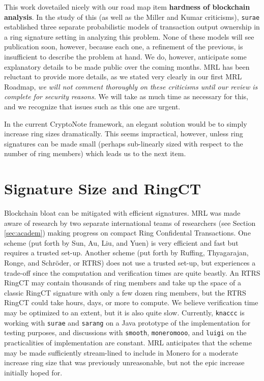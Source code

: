 \documentclass[12pt,english]{mrl}
\theoremstyle{definition}
\numberwithin{equation}{section}
\numberwithin{figure}{section}
\numberwithin{equation}{section}
\numberwithin{equation}{section}
\numberwithin{figure}{section}
\begin{document}
This work dovetailed nicely with our road map item \textbf{hardness of blockchain analysis}.  In the study of this (as well as the Miller and Kumar criticisms), \texttt{surae} established three separate probabilistic models of transaction output ownership in a ring signature setting in analyzing this problem. None of these models will see publication soon, however, because each one, a refinement of the previous, is insufficient to describe the problem at hand. We do, however, anticipate some explanatory details to be made public over the coming months. MRL has been reluctant to provide more details, as we stated very clearly in our first MRL Roadmap, \emph{we will not comment thoroughly on these criticisms until our review is complete for security reasons.} We will take as much time as necessary for this, and we recognize that issues such as this one are urgent.
    
In the current CryptoNote framework, an elegant solution would be to simply increase ring sizes dramatically. This seems impractical, however, unless ring signatures can be made small (perhaps sub-linearly sized with respect to the number of ring members) which leads us to the next item.
    
\section{Signature Size and RingCT}

Blockchain bloat can be mitigated with efficient signatures. MRL was made aware of research by two separate international teams of researchers (see Section \ref{sec:academ}) making progress on compact Ring Confidental Transactions. One scheme (put forth by Sun, Au, Liu, and Yuen) is very efficient and fast but requires a trusted set-up. Another scheme (put forth by Ruffing,  Thyagarajan, Ronge, and Schr{\"o}der, or RTRS) does not use a trusted set-up, but experiences a trade-off since the computation and verification times are quite beastly. An RTRS RingCT may contain thousands of ring members and take up the space of a classic RingCT signature with only a few dozen ring members, but the RTRS RingCT could take hours, days, or more to compute. We believe verification time may be optimized to an extent, but it is also quite slow. Currently, \texttt{knaccc} is working with \texttt{surae} and \texttt{sarang} on a Java prototype of the implementation for testing purposes, and discussions with \texttt{smooth}, \texttt{moneromooo}, and \texttt{luigi} on the practicalities of implementation are constant. MRL anticipates that the scheme may be made sufficiently stream-lined to include in Monero for a moderate increase ring size that was previously unreasonable, but not the epic increase initially hoped for.
    
\end{document}

